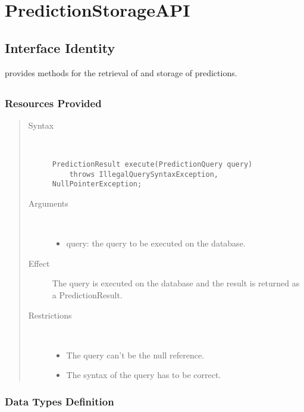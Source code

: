 \section{PredictionStorageAPI}
\label{api:prediction-storage-api}

\subsection{Interface Identity}

\npar {} provides methods for the retrieval of and
storage of predictions.

\subsection{}

\subsubsection{Resources Provided}

\begin{quote}
	\begin{description}
		\item[Syntax] \
		\begin{verbatim}
PredictionResult execute(PredictionQuery query)
    throws IllegalQuerySyntaxException, NullPointerException;
		\end{verbatim}
		\item[Arguments] \
		\begin{itemize}
		  \item query: the query to be executed on the database. 
		\end{itemize}
		\item[Effect] The query is executed on the database and the result is returned
		as a PredictionResult. 
		\item[Restrictions] \
		\begin{itemize}
		  \item The query can't be the null reference.
		  \item The syntax of the query has to be correct.
		\end{itemize}
	\end{description} 
\end{quote}

\subsubsection{Data Types Definition}

